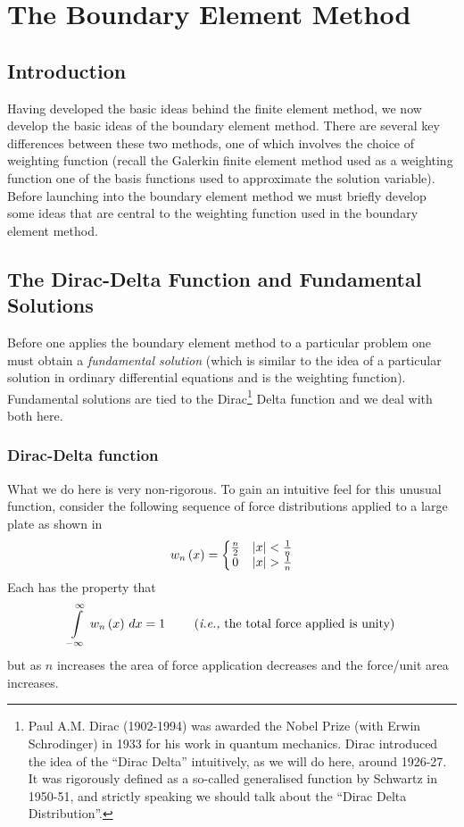 \chapter{The Boundary Element Method} 

\section{Introduction}

Having developed the basic ideas behind the finite element method, we now
develop the basic ideas of the boundary element method.  There are several key
differences between these two methods, one of which involves the choice of
weighting function (recall the Galerkin finite element method used as a
weighting function one of the basis functions used to approximate the solution
variable).  Before launching into the boundary element method we must briefly
develop some ideas that are central to the weighting function used in the
boundary element method.

\section{The Dirac-Delta Function and Fundamental Solutions}

Before one applies the boundary element method
to a particular problem one must obtain a \emph{fundamental
  solution} (which is similar to the idea of a
particular solution in ordinary differential equations and is the weighting
function). Fundamental solutions are tied to the Dirac\footnote{Paul A.M.
  Dirac (1902-1994) was awarded the Nobel Prize (with Erwin Schrodinger) in
  1933 for his work in quantum mechanics.  Dirac introduced the idea of the
  ``Dirac Delta'' intuitively, as we will do here, around 1926-27.  It was
  rigorously defined as a so-called generalised function by Schwartz in
  1950-51, and strictly speaking we should talk about the ``Dirac Delta
  Distribution''.} Delta function and we deal with both here.

\subsection{Dirac-Delta function} 

What we do here is very non-rigorous.  To gain an intuitive feel for this 
unusual function, consider the following sequence of force distributions 
applied to a large plate as shown in 
\begin{equation*}
   w_{n}\left( x \right)  = \left\{ \begin{matrix}
      \frac{n}{2} & \left| x \right| < \frac{1}{n} \\ 0 & \left| x \right| > \frac{1}{n}
    \end{matrix} \right.
\end{equation*}
Each has the property that
\begin{equation*}
    \gint{-\infty}{\infty}{\fnof{w_{n}}{x}}{x} = 1 \qquad 
    \text{ (\ie the total force applied is unity)}
\end{equation*}
but as $n$ increases the area of force application decreases and the 
force/unit area increases.

